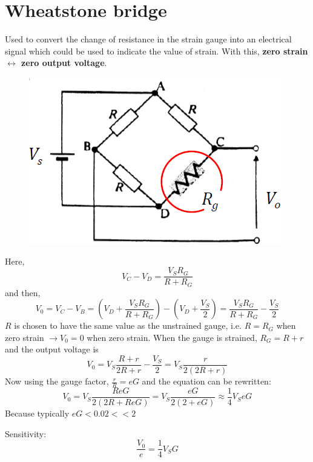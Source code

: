 \documentclass[class=report, crop=false, 12pt,a4paper]{standalone}
\begin{document}
\section{Wheatstone bridge}
Used to convert the change of resistance in the strain gauge into an electrical signal which could be used to indicate the value of strain. With this, \textbf{zero strain $\leftrightarrow$ zero output voltage}.
\begin{figure}[H]
  \centering
  \includegraphics[width = 0.6 \textwidth]{../img/diagram12.png}
\end{figure}
Here, 
\begin{equation}
  V_C - V_D = \frac{V_S R_G}{R + R_G}
\end{equation}
and then,
\begin{equation}
  V_0 = V_C - V_B = \left( V_D + \frac{V_S R_G}{R + R_G} \right) - \left( V_D + \frac{V_S}{2} \right) = \frac{V_S R_G}{R + R_G} - \frac{V_S}{2}
\end{equation}
$R$ is chosen to have the same value as the unstrained gauge, i.e. $R = R_G$ when zero strain $\rightarrow V_0 = 0$ when zero strain. When the gauge is strained, $R_G = R + r$ and the output voltage is
\begin{equation}
  V_0 = V_S \frac{R + r}{2R + r} - \frac{V_S}{2} = V_S \frac{r}{2(2R +r)}
\end{equation}
Now using the gauge factor, $\frac{r}{R} = eG$ and the equation can be rewritten: 
\begin{equation}
  V_0 = V_S \frac{ReG}{2(2R + ReG)} = V_S\frac{eG}{2(2+eG)} \approx \frac{1}{4} V_S eG
\end{equation}
Because typically $eG < 0.02 << 2$

Sensitivity:
\begin{equation}
  \frac{V_0}{e} = \frac{1}{4} V_S G
\end{equation}
\end{document}
